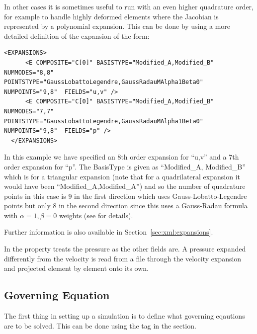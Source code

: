 In other cases it is sometimes useful to run with an even higher
quadrature order, for example to handle highly deformed elements where
the Jacobian is represented by a polynomial expansion. This can be done
by using a more detailed definition of the expansion of the form:


\begin{lstlisting}[style=XMLStyle]
  <EXPANSIONS>
      <E COMPOSITE="C[0]" BASISTYPE="Modified_A,Modified_B" NUMMODES="8,8" POINTSTYPE="GaussLobattoLegendre,GaussRadauMAlpha1Beta0" NUMPOINTS="9,8"  FIELDS="u,v" />
      <E COMPOSITE="C[0]" BASISTYPE="Modified_A,Modified_B" NUMMODES="7,7" POINTSTYPE="GaussLobattoLegendre,GaussRadauMAlpha1Beta0" NUMPOINTS="9,8"  FIELDS="p" />
  </EXPANSIONS>
\end{lstlisting}

In this example we have specified an 8th order expansion for ``u,v''
and a 7th order expansion for ``p''. The BasisType is given as
``Modified\_A, Modified\_B'' which is for a triangular expansion (note that for
a quadrilateral expansion it would have been ``Modified\_A,Modified\_A'')
and so the number of quadrature points in this case is 9 in the first
direction which uses Gauss-Lobatto-Legendre points but only 8 in the
second direction since this uses a Gauss-Radau formula with
$\alpha=1,\beta=0$ weights (see \cite{KaSh05} for details).

Further information is also available in Section~\ref{sec:xml:expansions}.

In  the 
property treats the pressure as the other fields are. A pressure expanded
differently from the velocity is read from a file through the velocity
expansion and projected element by element onto its own.

\subsection{Governing Equation}
\label{incns:governingEq}
The first thing in setting up a simulation is to define what governing eqautions
are to be solved. This can be done using the  tag in the
 section.      

